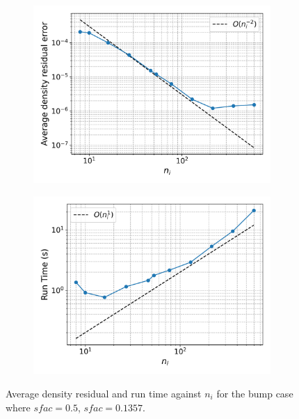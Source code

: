 \documentclass{article}
\begin{document}
\begin{figure}[H]
    \centering
    \begin{subfigure}{0.49\textwidth}
        \centering
        \includegraphics[width=0.99\textwidth]{figures/bump_d_avg_ni.png}
        \caption{}
        \label{fig:bump_d_avg_ni}
    \end{subfigure}
    \begin{subfigure}{0.49\textwidth}
        \centering
        \includegraphics[width=0.99\textwidth]{figures/bump_time_ni.png}
        \caption{}
        \label{fig:bump_time_ni}
    \end{subfigure}
    \caption{Average density residual and run time against $n_i$ for the bump case where $sfac = 0.5$, $sfac = 0.1357$.}
\end{figure}
\end{document}
